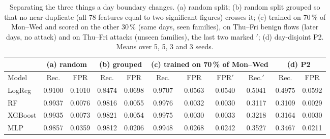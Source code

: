 \begin{table}[htbp]
\centering
\caption{Separating the three things a day boundary changes. (a) random split; (b) random split grouped so that no near-duplicate (all 78 features equal to two significant figures) crosses it; (c) trained on 70\,\% of Mon--Wed and scored on the other 30\,\% (same days, seen families), on Thu--Fri benign flows (later days, no attack) and on Thu--Fri attacks (unseen families), the last two marked $'$; (d) day-disjoint P2. Means over 5, 5, 3 and 3 seeds.}
\label{tab:decomp}
\scriptsize
\setlength{\tabcolsep}{3.2pt}\begin{tabular}{l|cc|cc|cccc|cc}
\hline
 & \multicolumn{2}{c|}{(a) random} & \multicolumn{2}{c|}{(b) grouped} & \multicolumn{4}{c|}{(c) trained on 70\,\% of Mon--Wed} & \multicolumn{2}{c}{(d) P2} \\
\hline
Model & Rec. & FPR & Rec. & FPR & Rec. & FPR & FPR$'$ & Rec.$'$ & Rec. & FPR \\
\hline LogReg & 0.9100 & 0.1010 & 0.8474 & 0.0698 & 0.9707 & 0.0563 & 0.0540 & 0.5041 & 0.4975 & 0.0592 \\
RF & 0.9937 & 0.0076 & 0.9816 & 0.0055 & 0.9976 & 0.0032 & 0.0030 & 0.3117 & 0.3109 & 0.0029 \\
XGBoost & 0.9935 & 0.0073 & 0.9821 & 0.0054 & 0.9975 & 0.0030 & 0.0033 & 0.3218 & 0.3164 & 0.0030 \\
MLP & 0.9857 & 0.0359 & 0.9812 & 0.0206 & 0.9948 & 0.0268 & 0.0242 & 0.3527 & 0.3467 & 0.0211 \\
\hline
\end{tabular}
\end{table}
